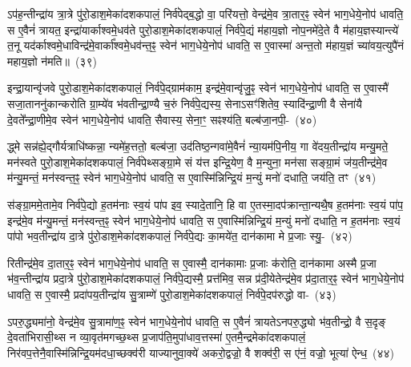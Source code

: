ऽप॑ह॒न्तीन्द्रा॑य त्रा॒त्रे पु॑रो॒डाश॒मेका॑\-दश\-कपालं॒ निर्व॑पेद्ब॒द्धो वा॒ परि॑यत्तो॒ वेन्द्र॑मे॒व त्रा॒तार॒ꣴ॒ स्वेन॑ भाग॒धेये॒नोप॑ धावति॒ स ए॒वैनं॑ त्रायत॒ इन्द्रा॑यार्काश्वमे॒धव॑ते पुरो॒डाश॒मेका॑\-दश\-कपालं॒ निर्व॑पे॒द्यं म॑हाय॒ज्ञो नोप॒नमे॑दे॒ते वै म॑हाय॒ज्ञस्यान्त्ये॑ त॒नू यद॑र्काश्वमे॒धाविन्द्र॑मे॒वार्का᳚श्वमे॒धव॑न्त॒ꣴ॒ स्वेन॑ भाग॒धेये॒नोप॑ धावति॒ स ए॒वास्मा॑ अन्त॒तो म॑हाय॒ज्ञं च्या॑वय॒त्युपै॑नं महाय॒ज्ञो न॑मति॥~(३९)

{\anuvakamend[{इ॒न्द्रि॒याव॑न्त॒ꣴ॒ स्वेन॑ भाग॒धेये॒नोप॑ धावति॒ सो᳚\-ऽर्कव॑न्त॒ꣴ॒ स्वेन॑ भाग॒धेये॑नै॒वेन्द्रा॑यास्मा॒न्मृधो᳚\-ऽस्मै स॒प्त च॑}]}

इन्द्रा॒यान्वृ॑जवे पुरो॒डाश॒मेका॑\-दश\-कपालं॒ निर्व॑पे॒द्ग्राम॑काम॒ इन्द्र॑मे॒वान्वृ॑जु॒ꣴ॒ स्वेन॑ भाग॒धेये॒नोप॑ धावति॒ स ए॒वास्मै॑ सजा॒ताननु॑कान्करोति ग्रा॒म्ये॑व भ॑वतीन्द्रा॒ण्यै च॒रुं निर्व॑पे॒द्यस्य॒ सेना\-ऽसꣳ॑शितेव॒ स्यादि॑न्द्रा॒णी वै सेना॑यै दे॒वते᳚न्द्रा॒णीमे॒व स्वेन॑ भाग॒धेये॒नोप॑ धावति॒ सैवास्य॒ सेना॒ꣳ॒ सꣴश्य॑ति॒ बल्ब॑जा॒नपी॒-~(४०)

द्ध्मे सन्न॑ह्ये॒द्गौर्यत्राधि॑ष्कन्ना॒ न्यमे॑ह॒त्ततो॒ बल्ब॑जा॒ उद॑तिष्ठ॒न्गवा॑\-मे॒वैनं॑ न्या॒यम॑पि॒नीय॒ गा वे॑दय॒तीन्द्रा॑य मन्यु॒मते॒ मन॑स्वते पुरो॒डाश॒मेका॑\-दश\-कपालं॒ निर्व॑पेथ्सङ्ग्रा॒मे सं य॑त्त इन्द्रि॒येण॒ वै म॒न्युना॒ मन॑सा सङ्ग्रा॒मं ज॑य॒तीन्द्र॑मे॒व म॑न्यु॒मन्तं॒ मन॑स्वन्त॒ꣴ॒ स्वेन॑ भाग॒धेये॒नोप॑ धावति॒ स ए॒वास्मि॑न्निन्द्रि॒यं म॒न्युं मनो॑ दधाति॒ जय॑ति॒ तꣳ~(४१)

स॑ङ्ग्रा॒ममे॒तामे॒व निर्व॑पे॒द्यो ह॒तम॑नाः स्व॒यं पा॑प इव॒ स्यादे॒तानि॒ हि वा ए॒तस्मा॒दप॑क्रान्ता॒न्यथै॒ष ह॒तम॑नाः स्व॒यं पा॑प॒ इन्द्र॑मे॒व म॑न्यु॒मन्तं॒ मन॑स्वन्त॒ꣴ॒ स्वेन॑ भाग॒धेये॒नोप॑ धावति॒ स ए॒वास्मि॑न्निन्द्रि॒यं म॒न्युं मनो॑ दधाति॒ न ह॒तम॑नाः स्व॒यं पा॑पो भव॒तीन्द्रा॑य दा॒त्रे पु॑रो॒डाश॒मेका॑\-दश\-कपालं॒ निर्व॑पे॒द्यः का॒मये॑त॒ दान॑कामा मे प्र॒जाः स्यु॒-~(४२)

रितीन्द्र॑मे॒व दा॒तार॒ꣴ॒ स्वेन॑ भाग॒धेये॒नोप॑ धावति॒ स ए॒वास्मै॒ दान॑कामाः प्र॒जाः क॑रोति॒ दान॑कामा अस्मै प्र॒जा भ॑व॒न्तीन्द्रा॑य प्रदा॒त्रे पु॑रो॒डाश॒मेका॑\-दश\-कपालं॒ निर्व॑पे॒द्यस्मै॒ प्रत्त॑मिव॒ सन्न प्र॑दी॒येतेन्द्र॑मे॒व प्र॑दा॒तार॒ꣴ॒ स्वेन॑ भाग॒धेये॒नोप॑ धावति॒ स ए॒वास्मै॒ प्रदा॑पय॒तीन्द्रा॑य सु॒त्राम्णे॑ पुरो॒डाश॒मेका॑\-दश\-कपालं॒ निर्व॑पे॒दप॑रुद्धो वा-~(४३)

ऽपरु॒द्ध्यमा॑नो॒ वेन्द्र॑मे॒व सु॒त्रामा॑ण॒ꣴ॒ स्वेन॑ भाग॒धेये॒नोप॑ धावति॒ स ए॒वैनं॑ त्रायते\-ऽनपरु॒द्ध्यो भ॑व॒तीन्द्रो॒ वै स॒दृङ् दे॒वता॑भिरासी॒थ्स न व्या॒वृत॑मगच्छ॒थ्स प्र॒जा\-प॑ति॒मुपा॑\-धाव॒त्तस्मा॑ ए॒तमै॒न्द्रमेका॑\-दश\-कपालं॒ निर॑वप॒त्तेनै॒वास्मि॑न्निन्द्रि॒य\-म॑दधा॒च्छक्व॑री याज्यानुवा॒क्ये॑ अकरो॒द्वज्रो॒ वै शक्व॑री॒ स ए॑नं॒ वज्रो॒ भूत्या॑ ऐन्ध॒~(४४)

